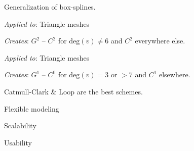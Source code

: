 \begin{algorithm}[Loop]
  Generalization of box-splines.

  \textit{Applied to}: Triangle meshes

  \textit{Creates}: \(G^2\) -- \(C^2\) for \(\text{deg}(v) \neq 6\) and \(C^2\) everywhere else.
\end{algorithm}

\begin{algorithm}
  \textit{Applied to}: Triangle meshes

  \textit{Creates}: \(G^1\) -- \(C^0\) for \(\text{deg}(v) = 3\) or \(> 7\) and \(C^1\) elsewhere.
\end{algorithm}

\begin{theorem}
  Catmull-Clark \& Loop are the best schemes.
\end{theorem}

\begin{itemize*}
  \item Flexible modeling
  \item Scalability
  \item Usability
\end{itemize*}
